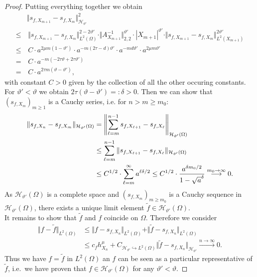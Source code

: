 \documentclass[a4paper, 10pt]{article}
\begin{document}
\begin{proof}
\noindent Putting everything together we obtain
\begin{align*}
&\Vert s_{f, X_{m+1}} - s_{f, X_{m}} \Vert_{\mathcal{H}_{\vartheta'}}^2 \\
\leq &\,\Vert s_{f, X_{m+1}} - s_{f, X_{m}} \Vert_{L^2(\Omega)}^{2 - 2\vartheta'} \cdot \Vert A_{X_{m+1}}^{-1} \Vert_{2,2}^{\vartheta'} \cdot |X_{m+1}|^{\vartheta'} \cdot  \Vert s_{f, X_{m+1}} - s_{f, X_{m}} \Vert_{L^2(X_{m+1})}^{2\vartheta'} \\
\leq &\,C \cdot a^{2\mu m (1-\vartheta')} \cdot a^{-m (2\tau - d) \vartheta'} \cdot a^{-md \vartheta'} \cdot a^{2\mu m \vartheta'} \\
= &\,C \cdot a^{-m(-2\tau\vartheta + 2\tau \vartheta')} \\
= &\,C \cdot a^{2\tau m(\vartheta - \vartheta')},
\end{align*}
with constant $C > 0$ given by the collection of all the other occuring constants. %
%
%
%
For $\vartheta' < \vartheta$ we obtain $2\tau (\vartheta - \vartheta') =: \delta > 0$.
Then we can show that $(s_{f, X_m})_{m \geq 1}$ is a Cauchy series, i.e. for $n > m \geq m_0$:
\begin{align}
\label{eq:cauchy_sequence_calculation}
\Vert s_{f, X_{n}} - s_{f, X_m} \Vert_{\mathcal{H}_{\vartheta'}(\Omega)} &= \left \Vert \sum_{\ell=m}^{n-1} s_{f, X_{\ell+1}} - s_{f, X_{\ell}} \right \Vert_{\mathcal{H}_{\vartheta'}(\Omega)} \notag \\
&\leq \sum_{\ell=m}^{n-1} \Vert s_{f, X_{\ell+1}} - s_{f, X_{\ell}} \Vert_{\mathcal{H}_{\vartheta'}(\Omega)} \notag \\
&\leq C^{1/2} \cdot \sum_{\ell=m}^{\infty} a^{\ell\delta/2} 
\leq C^{1/2} \cdot \frac{a^{\delta m_0/2}}{1 - \sqrt{a}^{\delta}} \stackrel{m_0 \rightarrow \infty}{\longrightarrow} 0.
\end{align}
As $\mathcal{H}_{\vartheta'}(\Omega)$ is a complete space and $(s_{f, X_m})_{m \geq m_0}$ is a Cauchy sequence in $\mathcal{H}_{\vartheta'}(\Omega)$, 
there exists a unique limit element $\tilde{f} \in \mathcal{H}_{\vartheta'}(\Omega)$. \\
It remains to show that $\tilde{f}$ and $f$ coincide on $\Omega$. 
Therefore we consider
\begin{align*}
\Vert f - \tilde{f} \Vert_{L^2(\Omega)} %
&\leq \Vert f - s_{f, X_n} \Vert_{L^2(\Omega)} + \Vert \tilde{f} - s_{f, X_n} \Vert_{L^2(\Omega)} \\
&\leq c_f h_{X_n}^{\mu} + C_{\mathcal{H}_{\vartheta'} \hookrightarrow L^2(\Omega)} \Vert \tilde{f} - s_{f, X_n} \Vert_{\mathcal{H}_{\vartheta'}} \stackrel{n \rightarrow \infty}{\longrightarrow} 0.
\end{align*}
Thus we have $f = \tilde{f}$ in $L^2(\Omega)$ an $f$ can be seen as a particular representative of $\tilde{f}$, 
i.e.\ we have proven that $f \in \mathcal{H}_{\vartheta'}(\Omega)$ for any $\vartheta' < \vartheta$. 
\end{proof}
\end{document}
